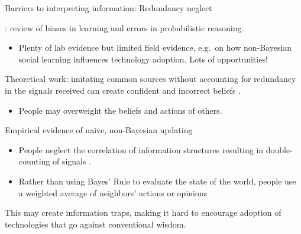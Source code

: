 \documentclass[aspectratio=169, 10pt, handout]{beamer}
\newenvironment{wideitemize}{\itemize\addtolength{\itemsep}{10pt}}{\enditemize}
\begin{document}
\begin{frame}{Barriers to interpreting information: Redundancy neglect}

\begin{wideitemize}

    \item \cite{benjamin2018errors}: review of biases in learning and errors in probabilistic reasoning.

    \begin{itemize}
    
    	\item Plenty of lab evidence but limited field evidence, e.g.\ on how non-Bayesian social learning influences technology adoption. Lots of opportunities!
    
    \end{itemize}

	\item Theoretical work: imitating common sources without accounting for redundancy in the signals received can create confident and incorrect beliefs \citep{eyster2014extensive}.

	\begin{itemize}

		\item People may overweight the beliefs and actions of others.

	\end{itemize}

	\item Empirical evidence of naive, non-Bayesian updating
	
	\begin{itemize}

		\item People neglect the correlation of information structures resulting in double-counting of signals \citep{enke2013correlation}.

		\item Rather than using Bayes' Rule to evaluate the state of the world, people use a weighted average of neighbors' actions or opinions \citep{Chandrasekhar2015}
		
	\end{itemize}

	\item This may create information traps, making it hard to encourage adoption of technologies that go against conventional wisdom. 

	
\end{wideitemize}

\end{frame}
\end{document}

